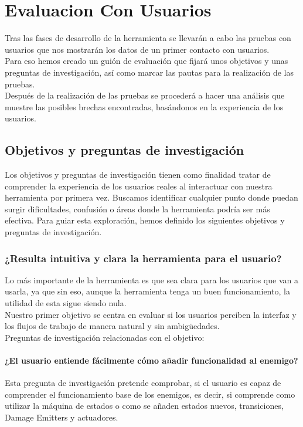 \setcounter{secnumdepth}{3} %
\chapter{Evaluacion Con Usuarios}
\label{cap:evaluacionConUsuarios}
Tras las fases de desarrollo de la herramienta se llevarán a cabo las pruebas con usuarios que nos mostrarán los datos de un primer contacto con usuarios.\\
Para eso hemos creado un guión de evaluación que fijará unos objetivos y unas preguntas de investigación, así como marcar las pautas para la realización de las pruebas. \\
Después de la realización de las pruebas se procederá a hacer una análisis que muestre las posibles brechas encontradas, basándonos en la experiencia de los usuarios. \\

\section{Objetivos y preguntas de investigación}
Los objetivos y preguntas de investigación tienen como finalidad tratar de comprender la experiencia de los usuarios reales al interactuar con nuestra herramienta por primera vez. Buscamos identificar cualquier punto donde puedan surgir dificultades, confusión o áreas donde la herramienta podría ser más efectiva. Para guiar esta exploración, hemos definido los siguientes objetivos y preguntas de investigación.

\subsection{¿Resulta intuitiva y clara la herramienta para el usuario?}
Lo más importante de la herramienta es que sea clara para los usuarios que van a usarla, ya que sin eso, aunque la herramienta tenga un buen funcionamiento, la utilidad de esta sigue siendo nula.\\
Nuestro primer objetivo se centra en evaluar si los usuarios perciben la interfaz y los flujos de trabajo de manera natural y sin ambigüedades.\\

Preguntas de investigación relacionadas con el objetivo:
\subsubsection{¿El usuario entiende fácilmente cómo añadir funcionalidad al enemigo?}
Esta pregunta de investigación pretende comprobar, si el usuario es capaz de comprender el funcionamiento base de los enemigos, es decir, si comprende como utilizar la máquina de estados o como se añaden estados nuevos, transiciones, Damage Emitters y actuadores.\\

